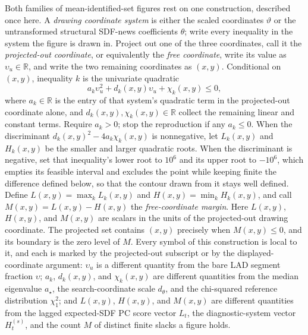 \documentclass[11pt]{article}
\begin{document}
Both families of mean-identified-set figures rest on one construction, described once here. A
\emph{drawing coordinate system} is either the scaled coordinates \(\vartheta\) or the untransformed
structural SDF-news coefficients \(\theta\); write every inequality in the system the figure is drawn in.
Project out one of the three coordinates, call it the \emph{projected-out coordinate}, or
equivalently the \emph{free coordinate}, write its value as \(\upsilon_u\in\mathbb R\), and write
the two remaining coordinates as \((x,y)\). Conditional on \((x,y)\), inequality \(k\) is the
univariate quadratic
\begin{equation}\label{eq:free-coordinate}
 a_k\upsilon_u^2+d_k(x,y)\upsilon_u+\chi_k(x,y)\le0,
\end{equation}
where \(a_k\in\mathbb R\) is the entry of that system's quadratic term in the projected-out
coordinate alone, and \(d_k(x,y),\chi_k(x,y)\in\mathbb R\) collect the remaining linear and constant
terms. Require \(a_k>0\); stop the reproduction if any \(a_k\le0\). When the discriminant
\(d_k(x,y)^2-4a_k\chi_k(x,y)\) is nonnegative, let \(L_k(x,y)\) and \(H_k(x,y)\) be the smaller and
larger quadratic roots. When the discriminant is negative, set that inequality's lower root to
\(10^{6}\) and its upper root to \(-10^{6}\), which empties its feasible interval and excludes the
point while keeping finite the difference defined below, so that the contour drawn
from it stays well defined.
Define \(L(x,y)=\max_kL_k(x,y)\) and \(H(x,y)=\min_kH_k(x,y)\), and call
\(M(x,y)=L(x,y)-H(x,y)\) the \emph{free-coordinate margin}. Here \(L(x,y)\), \(H(x,y)\), and
\(M(x,y)\) are scalars in the units of the projected-out drawing coordinate. The projected set
contains \((x,y)\) precisely when \(M(x,y)\le0\), and its boundary is the zero level of \(M\).
Every symbol of this construction is local to it, and each is marked by the projected-out subscript
or by the displayed-coordinate argument: \(\upsilon_u\) is a different quantity from the bare LAD
segment fraction \(\upsilon\); \(a_k\), \(d_k(x,y)\), and \(\chi_k(x,y)\) are different quantities
from the median eigenvalue \(a_\star\), the search-coordinate scale \(d_\theta\), and the
chi-squared reference distribution \(\chi_1^2\); and \(L(x,y)\), \(H(x,y)\), and \(M(x,y)\) are
different quantities from the lagged expected-SDF PC score vector \(L_t\), the diagnostic-system
vector \(H_t^{(s)}\), and the count \(M\) of distinct finite slacks a figure holds.
\end{document}
